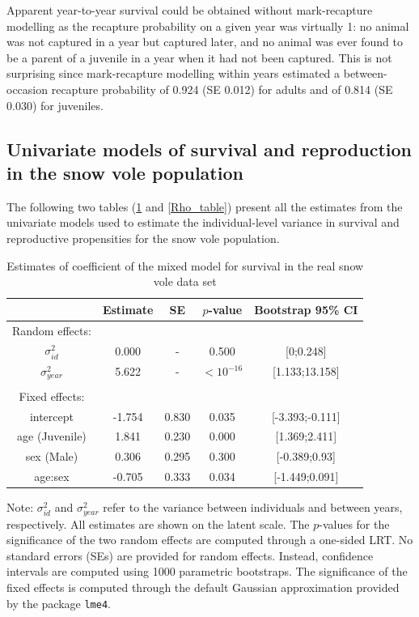 Apparent year-to-year survival could be obtained without mark-recapture modelling as the recapture probability on a given year was virtually 1: no animal was not captured in a year but captured later, and no animal was ever found to be a parent of a juvenile in a year when it had not been captured. This is not surprising since mark-recapture modelling within years estimated a between-occasion recapture probability of 0.924 (SE 0.012) for adults and of 0.814 (SE 0.030) for juveniles.


\subsection{Univariate models of survival and reproduction in the snow vole population}\label{ap:Uni}

The following two tables (\ref{Phi_table} and \ref{Rho_table}) present all the estimates from the univariate models used to estimate the individual-level variance in survival and reproductive propensities for the snow vole population.
\begin{table}[ht]
\begin{center}
\caption{Estimates of coefficient of the mixed model for survival in the real snow vole data set}\label{Phi_table}
\footnotesize
\begin{tabular}{ccccc}
  \toprule
 & Estimate & SE & $p$-value & Bootstrap 95\% CI  \\ 
  \midrule
	Random effects:\\
$\sigma_{id}^2$ & 0.000 & - & 0.500 & [0;0.248] \\ 
  $\sigma_{year}^2$ & 5.622 & - & $<10^{-16}$ & [1.133;13.158] \\ 
	\\
   Fixed effects:\\
intercept & -1.754 & 0.830 & 0.035 & [-3.393;-0.111] \\ 
  age (Juvenile) & 1.841 & 0.230 & 0.000 & [1.369;2.411] \\ 
  sex (Male) & 0.306 & 0.295 & 0.300 & [-0.389;0.93] \\ 
  age:sex & -0.705 & 0.333 & 0.034 & [-1.449;0.091] \\ 
   \bottomrule
\end{tabular}
\end{center}
{\scriptsize Note: $\sigma_{id}^2$ and $\sigma_{year}^2$ refer to the variance between individuals and between years, respectively. All estimates are shown on the latent scale. The $p$-values for the significance of the two random effects are computed through a one-sided LRT. No standard errors (SEs) are provided for random effects. Instead, confidence intervals are computed using 1000 parametric bootstraps. The significance of the fixed effects is computed through the default Gaussian approximation provided by the package \texttt{lme4}.}
\end{table}

